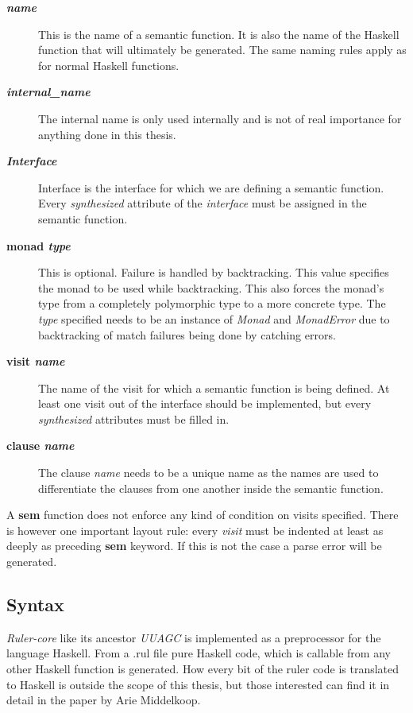\documentclass[twoside, titlepage, openright, a4paper]{book}
\newcommand{\Rcore}{\emph{Ruler-core }}
\begin{document}
\begin{description}
\item[\textbf{\textit{name}}] This is the name of a semantic function. It is also the name of the Haskell function that will ultimately be generated. The same naming rules apply as for normal Haskell functions.
\item[\textbf{\textit{internal\_name}}] The internal name is only used internally and is not of real importance for anything done in this thesis.
\item[\textbf{\textit{Interface}}] Interface is the interface for which we are defining a semantic function. Every \emph{synthesized} attribute of the \emph{interface} must be assigned in the semantic function.
\item[\textbf{monad \textit{type}}] { This is optional. Failure is handled by backtracking. This value specifies the monad to be used while backtracking. This also forces the monad's type from a completely polymorphic type to a more concrete type. The \textit{type} specified needs to be an instance of \emph{Monad} and \emph{MonadError} due to backtracking of match failures being done by catching errors.}
\item[\textbf{visit \textit{name}}] The name of the visit for which a semantic function is being defined. At least one visit out of the interface should be implemented, but every \emph{synthesized} attributes must be filled in.
\item[\textbf{clause \textit{name}}] The clause \textit{name} needs to be a unique name as the names are used to differentiate the clauses from one another inside the semantic function.
\end{description}

A \textbf{sem} function does not enforce any kind of condition on visits specified. There is however one important layout rule: every \emph{visit} must be indented at least as deeply as preceding \textbf{sem} keyword. If this is not the case a parse error will be generated.

\subsection{Syntax}
\Rcore like its ancestor \emph{UUAGC} is implemented as a preprocessor for the language Haskell. From a .rul file pure Haskell code, which is callable from any other Haskell function is generated. How every bit of the ruler code is translated to Haskell is outside the scope of this thesis, but those interested can find it in detail in the paper by Arie Middelkoop\cite{visitag}.
\end{document}
